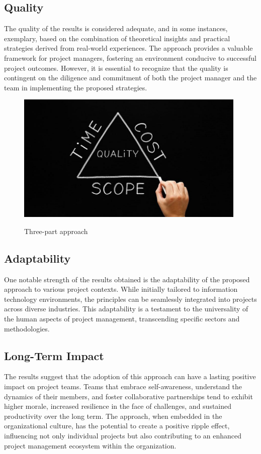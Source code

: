 \documentclass[11pt]{article}
\begin{document}
\subsection{Quality}
The quality of the results is considered adequate, and in some instances, exemplary, based on the combination of theoretical insights and practical strategies derived from real-world experiences. The approach provides a valuable framework for project managers, fostering an environment conducive to successful project outcomes. However, it is essential to recognize that the quality is contingent on the diligence and commitment of both the project manager and the team in implementing the proposed strategies.

\begin{figure}[htbp]
    \centering
    \includegraphics[width=11cm]{pic2.png.jpg}
    \label{fig:Framework}
    \caption{\label{three part approach}Three-part approach}
    \cite{Simplilearn}
\end{figure}

\subsection{Adaptability}
One notable strength of the results obtained is the adaptability of the proposed approach to various project contexts. While initially tailored to information technology environments, the principles can be seamlessly integrated into projects across diverse industries. This adaptability is a testament to the universality of the human aspects of project management, transcending specific sectors and methodologies.

\subsection{Long-Term Impact}
The results suggest that the adoption of this approach can have a lasting positive impact on project teams. Teams that embrace self-awareness, understand the dynamics of their members, and foster collaborative partnerships tend to exhibit higher morale, increased resilience in the face of challenges, and sustained productivity over the long term. The approach, when embedded in the organizational culture, has the potential to create a positive ripple effect, influencing not only individual projects but also contributing to an enhanced project management ecosystem within the organization.
\end{document}
